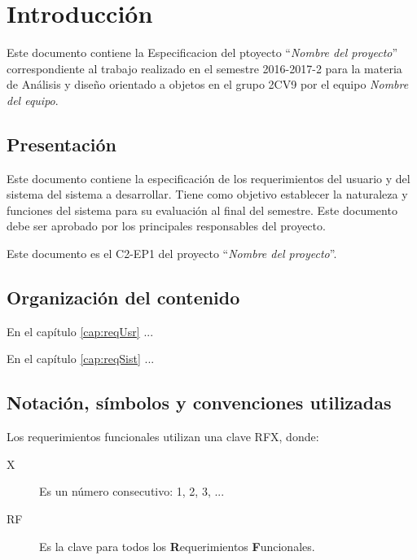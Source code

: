 \chapter{Introducción}


Este documento contiene la Especificacion del ptoyecto ``{\em Nombre del proyecto}'' correspondiente al trabajo realizado en el semestre 2016-2017-2 para la materia de Análisis y diseño orientado a objetos en el grupo 2CV9 por el equipo {\em Nombre del equipo}.

\section{Presentación}


Este documento contiene la especificación de los requerimientos del usuario y del sistema del sistema a desarrollar. Tiene como objetivo establecer la naturaleza y funciones del sistema para su evaluación al final del semestre. Este documento debe ser aprobado por los principales responsables del proyecto.

Este documento es el C2-EP1 del proyecto ``{\em Nombre del proyecto}''.

\section{Organización del contenido}

En el capítulo \ref{cap:reqUsr} ...

En el capítulo \ref{cap:reqSist} ...

\section{Notación, símbolos y convenciones utilizadas}

Los requerimientos funcionales utilizan una clave RFX, donde:

\begin{description}
	\item[X] Es un número consecutivo: 1, 2, 3, ...
	\item[RF] Es la clave para todos los {\textbf{R}}equerimientos {\textbf{F}}uncionales.
\end{description}

